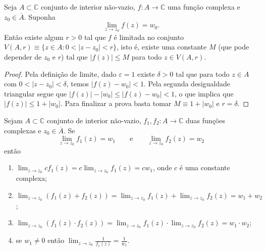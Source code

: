\begin{lema}\label{lema-limite-f-limitada}
Seja  $A\subset \mathbb{C}$ conjunto de interior não-vazio, $f:A\to\mathbb{C}$ uma função complexa
e $z_0\in \overline{A}$. Suponha 
\[
\lim_{z\to z_0} f(z) = w_0.
\]
Então existe algum $r>0$ tal que $f$ é limitada no conjunto $V(A,r)\equiv \{z\in A: 0<|z-z_0|<r\}$,
isto é, existe uma constante $M$ (que pode depender de $z_0$ e $r$) tal que   $|f(z)|\leq M$
para todo $z\in V(A,r)$.
\end{lema}
\begin{proof}
Pela definição de limite, dado $\varepsilon=1$ existe $\delta>0$ tal que para todo $z\in A$ com 
$0<|z-z_0|<\delta$, temos $|f(z)-w_0|<1$. Pela segunda desigualdade triangular segue que 
$|f(z)|-|w_0|\leqslant |f(z)-w_0|<1$, o que implica que $|f(z)|\leqslant 1+|w_0|$. 
Para finalizar a prova basta tomar $M\equiv 1+|w_0|$ e $r=\delta$.
\end{proof}


\begin{proposicao}\label{prop-propriedades-limite-funcao-complexa}
Sejam $A\subset \mathbb{C}$ conjunto de interior não-vazio, $f_1,f_2:A\to\mathbb{C}$ duas funções complexas
e $z_0\in \overline{A}$. Se 
\[
\lim_{z\to z_0} f_1(z) = w_1\qquad\text{e}\qquad \lim_{z\to z_0} f_2(z) = w_2
\]
então 
\begin{enumerate}
\item $\displaystyle \lim_{z\to z_0} cf_1(z) = c \lim_{z\to z_0} f_1(z) = cw_1$, onde $c$ é uma constante complexa;
\item $\displaystyle \lim_{z\to z_0} (f_1(z)+f_2(z)) = \lim_{z\to z_0} f_1(z) + \lim_{z\to z_0}f_2(z) = w_1+w_2$;
\item $\displaystyle \lim_{z\to z_0} (f_1(z)\cdot f_2(z)) = \lim_{z\to z_0} f_1(z) \cdot \lim_{z\to z_0}f_2(z) = w_1\cdot w_2$;
\item se $w_1\neq 0$ então $\displaystyle \lim_{z\to z_0}\frac{1}{f_1(z)} = \frac{1}{w_1}$.
\end{enumerate}
\end{proposicao}

